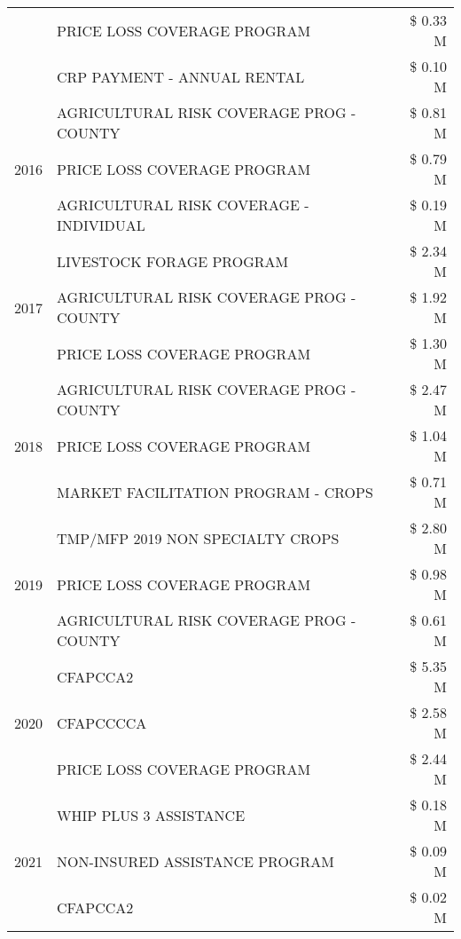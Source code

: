 \begin{tabular}{llr}
 & PRICE LOSS COVERAGE PROGRAM & \$ 0.33 M \\
 & CRP PAYMENT - ANNUAL RENTAL & \$ 0.10 M \\
\cline{1-3}
\multirow[t]{3}{*}{2016} & AGRICULTURAL RISK COVERAGE PROG - COUNTY & \$ 0.81 M \\
 & PRICE LOSS COVERAGE PROGRAM & \$ 0.79 M \\
 & AGRICULTURAL RISK COVERAGE - INDIVIDUAL & \$ 0.19 M \\
\cline{1-3}
\multirow[t]{3}{*}{2017} & LIVESTOCK FORAGE PROGRAM & \$ 2.34 M \\
 & AGRICULTURAL RISK COVERAGE PROG - COUNTY & \$ 1.92 M \\
 & PRICE LOSS COVERAGE PROGRAM & \$ 1.30 M \\
\cline{1-3}
\multirow[t]{3}{*}{2018} & AGRICULTURAL RISK COVERAGE PROG - COUNTY & \$ 2.47 M \\
 & PRICE LOSS COVERAGE PROGRAM & \$ 1.04 M \\
 & MARKET FACILITATION PROGRAM - CROPS & \$ 0.71 M \\
\cline{1-3}
\multirow[t]{3}{*}{2019} & TMP/MFP 2019 NON SPECIALTY CROPS & \$ 2.80 M \\
 & PRICE LOSS COVERAGE PROGRAM & \$ 0.98 M \\
 & AGRICULTURAL RISK COVERAGE PROG - COUNTY & \$ 0.61 M \\
\cline{1-3}
\multirow[t]{3}{*}{2020} & CFAPCCA2 & \$ 5.35 M \\
 & CFAPCCCCA & \$ 2.58 M \\
 & PRICE LOSS COVERAGE PROGRAM & \$ 2.44 M \\
\cline{1-3}
\multirow[t]{3}{*}{2021} & WHIP PLUS 3 ASSISTANCE & \$ 0.18 M \\
 & NON-INSURED ASSISTANCE PROGRAM & \$ 0.09 M \\
 & CFAPCCA2 & \$ 0.02 M \\
\cline{1-3}
\bottomrule
\end{tabular}
